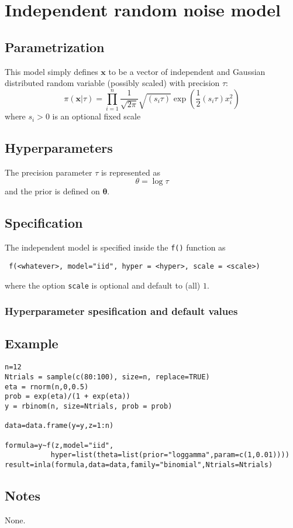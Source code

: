 \documentclass[a4paper,11pt]{article}
\begin{document}
\section*{Independent random noise model}

\subsection*{Parametrization}

This model simply defines $\mathbf{x}$ to be a vector of independent
and Gaussian distributed random variable (possibly scaled) with
precision $\tau$:
\begin{displaymath}
    \pi(\mathbf{x}|\tau) = \prod_{i=1}^{n} \frac{1}{\sqrt{2\pi}}
    \sqrt{(s_{i}\tau)}\exp\left(\frac{1}{2} (s_{i}\tau) x_{i}^{2}\right)
\end{displaymath}
where $s_{i} > 0$ is an optional fixed scale

\subsection*{Hyperparameters}

The precision parameter $\tau$ is represented as
\begin{displaymath}
    \theta =\log \tau
\end{displaymath}
and the prior is defined on $\mathbf{\theta}$.

\subsection*{Specification}

The independent model is specified inside the {\tt f()} function as
\begin{verbatim}
 f(<whatever>, model="iid", hyper = <hyper>, scale = <scale>)
\end{verbatim}
where the option \verb|scale| is optional and default to (all) $1$.

\subsubsection*{Hyperparameter spesification and default values}


\subsection*{Example}

\begin{verbatim}
n=12
Ntrials = sample(c(80:100), size=n, replace=TRUE)
eta = rnorm(n,0,0.5)
prob = exp(eta)/(1 + exp(eta))
y = rbinom(n, size=Ntrials, prob = prob)

data=data.frame(y=y,z=1:n)

formula=y~f(z,model="iid",
           hyper=list(theta=list(prior="loggamma",param=c(1,0.01))))
result=inla(formula,data=data,family="binomial",Ntrials=Ntrials)
\end{verbatim}


\subsection*{Notes}

None.
\end{document}
